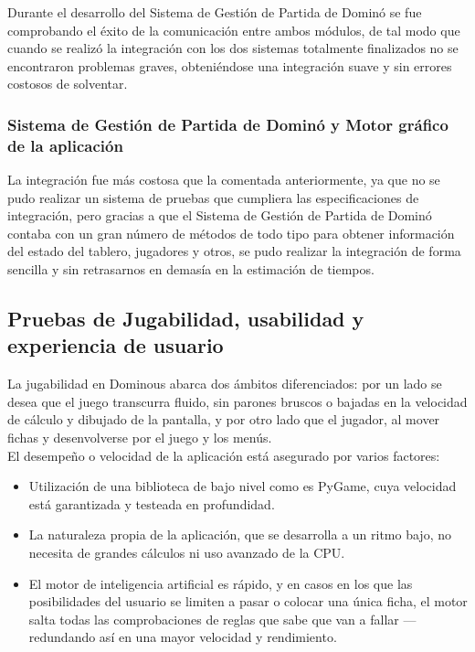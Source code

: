 Durante el desarrollo del Sistema de Gestión de Partida de Dominó se fue comprobando el éxito de la comunicación entre ambos
módulos, de tal modo que cuando se realizó la integración con los dos sistemas totalmente finalizados no se encontraron
problemas graves, obteniéndose una integración suave y sin errores costosos de solventar.

\subsubsection{Sistema de Gestión de Partida de Dominó y Motor gráfico de la aplicación}

La integración fue más costosa que la comentada anteriormente, ya que no se pudo realizar un sistema de pruebas que
cumpliera las especificaciones de integración, pero gracias a que el Sistema de Gestión de Partida de Dominó contaba
con un gran número de métodos de todo tipo para obtener información del estado del tablero, jugadores y otros,
se pudo realizar la integración de forma sencilla y sin retrasarnos en demasía en la estimación de tiempos.


\subsection{Pruebas de Jugabilidad, usabilidad y experiencia de usuario}

La jugabilidad en Dominous abarca dos ámbitos diferenciados: por un lado se desea que el juego transcurra fluido, sin
parones bruscos o bajadas en la velocidad de cálculo y dibujado de la pantalla, y por otro lado que el jugador, al mover
fichas y desenvolverse por el juego y los menús. \\

El desempeño o velocidad de la aplicación está asegurado por varios factores:

\begin{itemize}
    \item Utilización de una biblioteca de bajo nivel como es PyGame, cuya velocidad está garantizada y testeada en profundidad.
    \item La naturaleza propia de la aplicación, que se desarrolla a un ritmo bajo, no necesita de grandes cálculos ni
            uso avanzado de la CPU.
    \item El motor de inteligencia artificial es rápido, y en casos en los que las posibilidades del usuario se limiten
            a pasar o colocar una única ficha, el motor salta todas las comprobaciones de reglas que sabe que van a
            fallar --- redundando así en una mayor velocidad y rendimiento.
\end{itemize}

